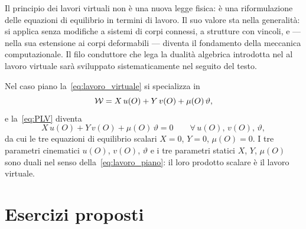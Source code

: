 \begin{oss}
	Il principio dei lavori virtuali non è una nuova legge
	fisica: è una riformulazione delle equazioni di
	equilibrio in termini di lavoro. Il suo valore sta
	nella generalità: si applica senza modifiche a sistemi
	di corpi connessi, a strutture con vincoli, e --- nella
	sua estensione ai corpi deformabili --- diventa il
	fondamento della meccanica computazionale. Il filo
	conduttore che lega la dualità algebrica introdotta nel
	 al lavoro virtuale
	sarà sviluppato sistematicamente nel seguito del testo.
\end{oss}


\begin{oss}
	Nel caso piano la~\eqref{eq:lavoro_virtuale} si specializza in
	\begin{equation}\label{eq:lavoro_piano}
		\mathcal{W} = X\,u(O) + Y\,v(O) + \mu(O)\,\vartheta,
	\end{equation}
	e la~\eqref{eq:PLV} diventa
	\begin{equation}
		X\,u(O) + Y\,v(O) + \mu(O)\,\vartheta = 0
		\qquad \forall\,u(O),\,v(O),\,\vartheta,
	\end{equation}
	da cui le tre equazioni di equilibrio scalari $X = 0$, $Y = 0$, $\mu(O) = 0$. I tre parametri cinematici $u(O)$, $v(O)$, $\vartheta$ e i tre parametri statici $X$, $Y$, $\mu(O)$ sono duali nel senso della~\eqref{eq:lavoro_piano}: il loro prodotto scalare è il lavoro virtuale.
\end{oss}


\section{Esercizi proposti}

